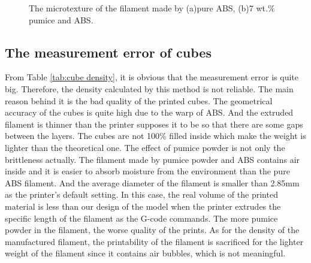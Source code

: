 \begin{figure}[htbp] %
	\centering
  \caption[The microtexture of the filament]{\footnotesize The microtexture of the filament made by (a)pure ABS, (b)7 wt.$\%$ pumice and ABS. }
  \label{Fig:slice}
\end{figure}

\subsection{The measurement error of cubes}
From Table \ref{tab:cube density}, it is obvious that the measurement error is quite big. Therefore, the density calculated by this method is not reliable. The main reason behind it is the bad quality of the printed cubes. The geometrical accuracy of the cubes is quite high due to the warp of ABS. And the extruded filament is thinner than the printer supposes it to be so that there are some gaps between the layers. The cubes are not 100$\%$ filled inside which make the weight is lighter than the theoretical one. The effect of pumice powder is not only the brittleness actually. The filament made by pumice powder and ABS contains air inside and it is easier to absorb moisture from the environment than the pure ABS filament. And the average diameter of the filament is smaller than 2.85mm as the printer's default setting. In this case, the real volume of the printed material is less than our design of the model when the printer extrudes the specific length of the filament as the G-code commands. The more pumice powder in the filament, the worse quality of the prints. As for the density of the manufactured filament, the printability of the filament is sacrificed for the lighter weight of the filament since it contains air bubbles, which is not meaningful.

